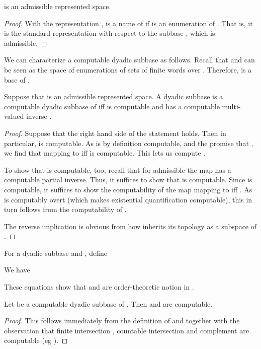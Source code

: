 \documentclass{eptcs-modified}
\begin{document}
\begin{proposition}
   is an admissible represented space.
\end{proposition}
\begin{proof}
  With the representation ,
 is a name of  if  is an enumeration of .
That is, it is the standard representation with respect to the subbase
, which is admissible.
\end{proof}


We can characterize a computable dyadic subbase as follows.
Recall that  and
 can be seen as the space of enumerations of sets of finite words over . Therefore,  is a base of .


\begin{proposition} \label{prop:computablepds}
Suppose that  is an admissible represented space.
A dyadic subbase 
is a computable dyadic subbase of  iff  is computable and has a computable multi-valued inverse .

\begin{proof}
Suppose that the right hand side of the statement holds. Then in particular,  is computable. As  is by definition computable, and the promise that , we find that  mapping  to  iff  is computable. This lets us compute .

To show that  is computable, too, recall that for admissible  the map  has a computable partial inverse. Thus, it suffices to show that  is computable.
Since  is computable, it suffices to show the
computability of the map  mapping  to  iff . As  is computably overt (which makes existential quantification computable), this in turn follows from the computability of .

The reverse implication is obvious from how  inherits its topology as a subspace of .
\end{proof}
\end{proposition}


For a dyadic subbase  and , define


We have

These equations show that  and  are order-theoretic notion in .


\begin{proposition}
\label{prop:dyadicsubbase}
Let  be a computable dyadic subbase of . Then  and  are computable.
\begin{proof}
This follows immediately from the definition of  and  together with the observation that finite intersection , countable intersection  and complement  are computable (eg \cite{pauly-synthetic}).
\end{proof}
\end{proposition}
\end{document}
